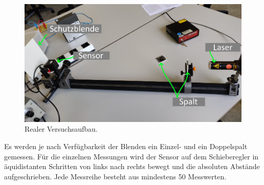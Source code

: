 \begin{figure}
    \centering
    \includegraphics[width=\textwidth]{plots/tatVersuchsaufbau.jpg}
    \caption{Realer Versuchsaufbau.}
    \label{fig:tatVersuchsaufbau}
\end{figure}

Es werden je nach Verfügbarkeit der Blenden ein Einzel- und ein Doppelspalt gemessen.
Für die einzelnen Messungen wird der Sensor auf dem Schieberegler in äquidistanten Schritten von links nach rechts bewegt und die absoluten Abstände aufgeschrieben.
Jede Messreihe besteht aus mindestens 50 Messwerten.